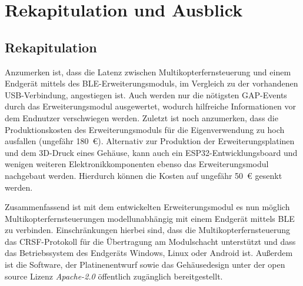 
\chapter{Rekapitulation und Ausblick}
\section{Rekapitulation}

Anzumerken ist, dass die Latenz zwischen Multikopterfernsteuerung und einem Endgerät mittels des \ac{BLE}-Erweiterungsmoduls, im Vergleich zu der vorhandenen USB-Verbindung, angestiegen ist. Auch werden nur die nötigsten \ac{GAP}-Events durch das Erweiterungsmodul ausgewertet, wodurch hilfreiche Informationen vor dem Endnutzer verschwiegen werden. Zuletzt ist noch anzumerken, dass die Produktionskosten des Erweiterungsmoduls für die Eigenverwendung zu hoch ausfallen (ungefähr 180~€). Alternativ zur Produktion der Erweiterungsplatinen und dem 3D-Druck eines Gehäuse, kann auch ein ESP32-Entwicklungsboard und wenigen weiteren Elektronikkomponenten ebenso das Erweiterungsmodul nachgebaut werden. Hierdurch können die Kosten auf ungefähr 50~€ gesenkt werden. 

Zusammenfassend ist mit dem entwickelten Erweiterungsmodul es nun möglich Multikopterfernsteuerungen modellunabhängig mit einem Endgerät mittels \ac{BLE} zu verbinden. Einschränkungen hierbei sind, dass die Multikopterfernsteuerung das CRSF-Protokoll für die Übertragung am Modulschacht unterstützt und dass das Betriebssystem des Endgeräts Windows, Linux oder Android ist. Außerdem ist die Software, der Platinenentwurf sowie das Gehäusedesign unter der open source Lizenz \textit{Apache-2.0} öffentlich zugänglich bereitgestellt.


